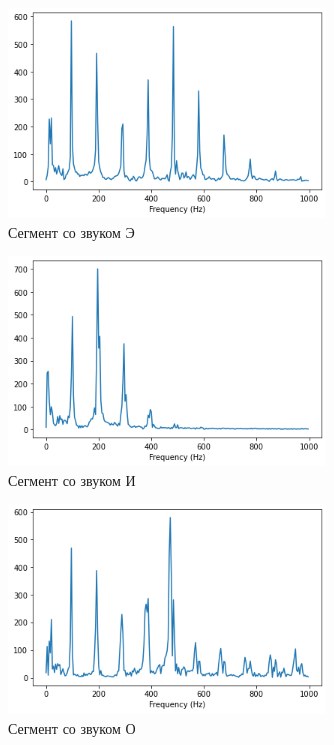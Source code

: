 \documentclass[a4paper, 12pt]{report}
\begin{document}
	\begin{figure}[H]
		\centering
		\includegraphics[width=0.75\textwidth]{word2.png}
		\caption{Сегмент со звуком Э}
		\label{fig:word2}
	\end{figure}
	\begin{figure}[H]
		\centering
		\includegraphics[width=0.75\textwidth]{word3.png}
		\caption{Сегмент со звуком И}
		\label{fig:word3}
	\end{figure}
	\begin{figure}[H]
		\centering
		\includegraphics[width=0.75\textwidth]{word4.png}
		\caption{Сегмент со звуком О}
		\label{fig:word4}
	\end{figure}
\end{document}
